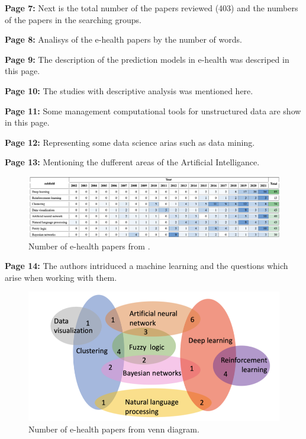     \textbf{Page 7:}
    Next is the total number of the papers reviewed (403) and the numbers of the papers in the searching groups.
    
    \textbf{Page 8:}
    Analisys of the e-health papers by the number of words.
    
    \textbf{Page 9:}
    The description of the prediction models in e-health was descriped in this page.
    
    \textbf{Page 10:}
    The studies with descriptive analysis was mentioned here.
    
    \textbf{Page 11:}
    Some management computational tools for unstructured data are show in this page.
    
    \textbf{Page 12:}
    Representing some data science arias such as data mining.
    
    \textbf{Page 13:}
    Mentioning the dufferent areas of the Artificial Intelligance.
    \begin{figure}[H]
        \centering
        \includegraphics[width=1\textwidth]{figures/0008_SR01ES23/fig2.png}
        \caption{Number of e-health papers from \cite{x249}.}
        \label{fig2:0008_SR01ES23}
    \end{figure}

    \textbf{Page 14:}
    The authors intriduced a machine learning and the questions which arise when working with them.
    \begin{figure}[H]
        \centering
        \includegraphics[width=.8\textwidth]{figures/0008_SR01ES23/fig3.png}
        \caption{Number of e-health papers from \cite{x249} venn diagram.}
        \label{fig3:0008_SR01ES23}
    \end{figure}
    
